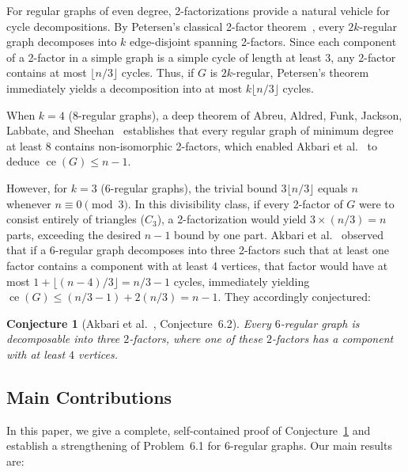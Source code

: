 \documentclass[11pt,reqno]{amsart}
\newtheorem{conjecture}[theorem]{Conjecture}
\theoremstyle{definition}
\theoremstyle{remark}
\DeclareMathOperator{\ce}{ce}
\begin{document}
For regular graphs of even degree, 2-factorizations provide a natural vehicle for cycle decompositions. By Petersen's classical 2-factor theorem~\cite{Pe91}, every $2k$-regular graph decomposes into $k$ edge-disjoint spanning 2-factors. Since each component of a 2-factor in a simple graph is a simple cycle of length at least $3$, any 2-factor contains at most $\lfloor n/3 \rfloor$ cycles. Thus, if $G$ is $2k$-regular, Petersen's theorem immediately yields a decomposition into at most $k \lfloor n/3 \rfloor$ cycles. 

When $k = 4$ ($8$-regular graphs), a deep theorem of Abreu, Aldred, Funk, Jackson, Labbate, and Sheehan~\cite{AAFJLS04} establishes that every regular graph of minimum degree at least $8$ contains non-isomorphic 2-factors, which enabled Akbari et al.~\cite{AABC25} to deduce $\ce(G) \le n-1$.

However, for $k = 3$ ($6$-regular graphs), the trivial bound $3 \lfloor n/3 \rfloor$ equals $n$ whenever $n \equiv 0 \pmod 3$. In this divisibility class, if every 2-factor of $G$ were to consist entirely of triangles ($C_3$), a 2-factorization would yield $3 \times (n/3) = n$ parts, exceeding the desired $n-1$ bound by one part. Akbari et al.~\cite{AABC25} observed that if a $6$-regular graph decomposes into three 2-factors such that at least one factor contains a component with at least 4 vertices, that factor would have at most $1 + \lfloor (n-4)/3 \rfloor = n/3 - 1$ cycles, immediately yielding $\ce(G) \le (n/3 - 1) + 2(n/3) = n-1$. They accordingly conjectured:

\begin{conjecture}[Akbari et al.~\cite{AABC25}, Conjecture~6.2]\label{conj:aabc-6.2}
Every $6$-regular graph is decomposable into three $2$-factors, where one of these $2$-factors has a component with at least $4$ vertices.
\end{conjecture}

\subsection*{Main Contributions}
In this paper, we give a complete, self-contained proof of Conjecture~\ref{conj:aabc-6.2} and establish a strengthening of Problem~6.1 for $6$-regular graphs. Our main results are:
\end{document}

